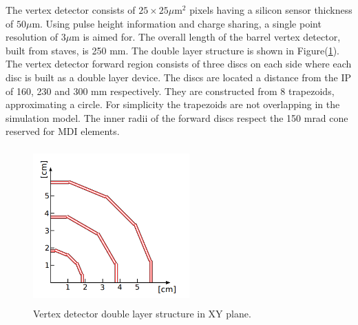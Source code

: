 The vertex detector consists of 
$25\times25\mu$m$^2$ pixels 
having  a silicon sensor thickness of $50\mu$m. Using
pulse height information and charge sharing, a single point 
resolution of $3\mu$m is aimed for.
The overall length of the barrel vertex detector, built from staves, is 250 mm. The double layer
structure is shown in Figure(\ref{fig:vertex2}).
The vertex detector forward region consists of three discs on 
each side where  each disc is built as a double layer device. The 
discs are located a distance from the IP of 160, 230 and 300 
mm respectively. They are
constructed from 8 trapezoids, approximating a circle. For 
simplicity the trapezoids are not overlapping
in the simulation model. The inner radii of the forward discs 
respect the 150 mrad cone reserved for MDI elements. 
\begin{figure}
    \centering
    \includegraphics[width=6cm, height=6cm]{fcc_det/ph5.png}
    \caption{Vertex detector double layer structure in XY plane.}
    \label{fig:vertex2}
\end{figure}

